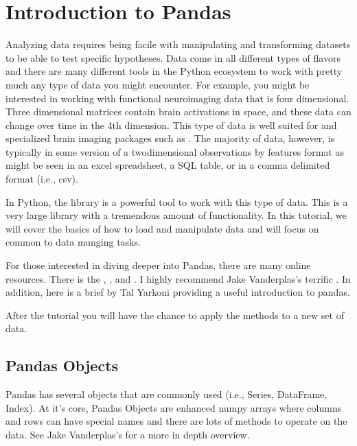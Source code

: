 \documentclass[letterpaper,10pt,english]{sphinxmanual}
\begin{document}
\section{Introduction to Pandas}
\label{\detokenize{content/Introduction_to_Pandas:introduction-to-pandas}}\label{\detokenize{content/Introduction_to_Pandas::doc}}

Analyzing data requires being facile with manipulating and transforming datasets to be able to test specific hypotheses. Data come in all different types of flavors and there are many different tools in the Python ecosystem to work with pretty much any type of data you might encounter. For example, you might be interested in working with functional neuroimaging data that is four dimensional. Three dimensional matrices contain brain activations in space, and these data can change over time in the 4th dimension. This type of data is well suited for  and specialized brain imaging packages such as . The majority of data, however, is typically in some version of a two\sphinxhyphen{}dimensional observations by features format as might be seen in an excel spreadsheet, a SQL table, or in a comma delimited format (i.e., csv).

In Python, the  library is a powerful tool to work with this type of data. This is a very large library with a tremendous amount of functionality. In this tutorial, we will cover the basics of how to load and manipulate data and will focus on common to data munging tasks.

For those interested in diving deeper into Pandas, there are many online resources. There is the , , and . I highly recommend  Jake Vanderplas’s terrific .   In addition, here is a brief  by Tal Yarkoni providing a useful introduction to pandas.

After the tutorial you will have the chance to apply the methods to a new set of data.


\subsection{Pandas Objects}
\label{\detokenize{content/Introduction_to_Pandas:pandas-objects}}
Pandas has several objects that are commonly used (i.e., Series, DataFrame, Index). At it’s core, Pandas Objects are enhanced numpy arrays where columns and rows can have special names and there are lots of methods to operate on the data. See Jake Vanderplas’s  for a more in depth overview.
\end{document}
